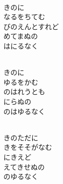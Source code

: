 \documentclass[10pt,b5j]{tarticle} %
\begin{document}
\vspace{1.5em} %
\newcommand{\linespace}{0.5em} %
\newcommand{\blocksize}{0.5\hsize} %
\newcommand{\itemmargin}{3em} %
\begin{enumerate} %
    \setlength{\itemindent}{\itemmargin} %
    \begin{minipage}[c]{\blocksize}
    
        \vspace{\linespace}
        \item~\\
        きのに\\
        なるをちてむ\\
        びのえんとすれど\\
        めてまぬの\\
        はにるなく
        
    \end{minipage}
    \begin{minipage}[c]{\blocksize}
        
        \vspace{\linespace}
        \item~\\
        きのに\\
        ゆるをかむ\\
        のはれうとも\\
        にらぬの\\
        のはゆるなく
        
    \end{minipage}
    \begin{minipage}[c]{\blocksize}
        
        \vspace{\linespace}
        \item~\\
        きのただに\\
        きをそそがなむ\\
        にきえど\\
        えてきせぬの\\
        のゆるなく
    
    \end{minipage}
\end{enumerate} %
\end{document}
